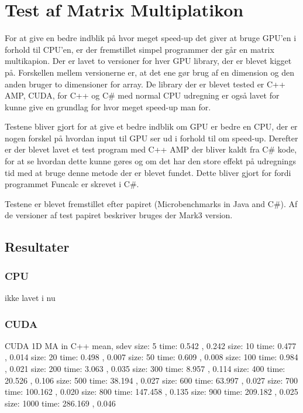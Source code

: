 \section{Test af Matrix Multiplatikon}
For at give en bedre indblik på hvor meget speed-up det giver at bruge GPU'en i forhold til CPU'en, er der fremstillet simpel programmer der går en matrix multikapion. Der er lavet to versioner for hver GPU library, der er blevet kigget på. Forskellen mellem versionerne er, at det ene gør brug af en dimension og den anden bruger to dimensioner for array. De library der er blevet tested er C++ AMP, CUDA, for C++ og C\# med normal CPU udregning er også lavet for kunne give en grundlag for hvor meget speed-up man for.

Testene bliver gjort for at give et bedre indblik om GPU er bedre en CPU, der er nogen forskel på hvordan input til GPU ser ud i forhold til om speed-up. Derefter er der blevet lavet et test program med C++ AMP der bliver kaldt fra C\# kode, for at se hvordan dette kunne gøres og om det har den store effekt på udregnings tid med at bruge denne metode der er blevet fundet. Dette bliver gjort for fordi programmet Funcalc er skrevet i C\#.

Testene er blevet fremstillet efter papiret (Microbenchmarks in Java and C\#). Af de versioner af test papiret beskriver bruges der Mark3 version.


\subsection{Resultater}
\subsubsection{CPU}
ikke lavet i nu
\subsubsection{CUDA}
CUDA 1D MA in C++  mean, sdev \newline
size: 5 time: 0.542 , 0.242 \newline
size: 10 time: 0.477 , 0.014 \newline
size: 20 time: 0.498 , 0.007 \newline
size: 50 time: 0.609 , 0.008 \newline
size: 100 time: 0.984 , 0.021 \newline
size: 200 time: 3.063 , 0.035 \newline
size: 300 time: 8.957 , 0.114 \newline
size: 400 time: 20.526 , 0.106 \newline
size: 500 time: 38.194 , 0.027 \newline
size: 600 time: 63.997 , 0.027 \newline
size: 700 time: 100.162 , 0.020 \newline
size: 800 time: 147.458 , 0.135 \newline
size: 900 time: 209.182 , 0.025 \newline
size: 1000 time: 286.169 , 0.046 \newline
